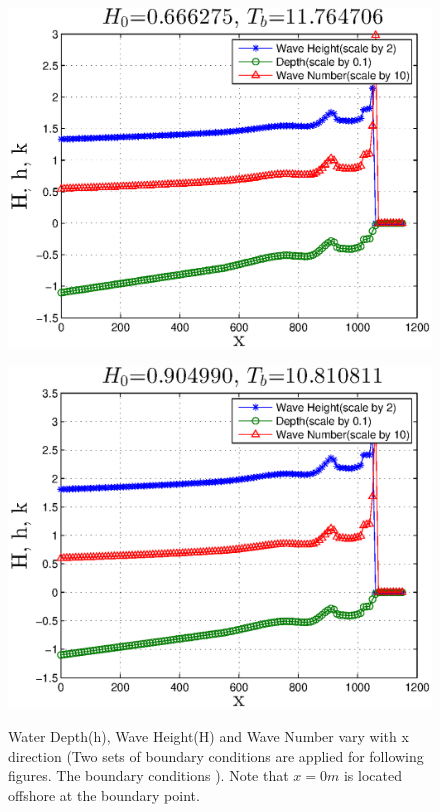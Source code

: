 \begin{figure}[h]
\begin{minipage}[b]{0.47\linewidth}
\centering
\includegraphics[width=\textwidth]{forward_plot/p1_1.eps}
\label{FigHhk_1}
\end{minipage}
\hspace{0.2cm}
\begin{minipage}[b]{0.47\linewidth}
\centering
\includegraphics[width=\textwidth]{forward_plot/p2_1.eps}
\label{FigHhk_2}
\end{minipage}
\caption{Water Depth(h), Wave Height(H) and Wave Number vary with x direction (Two sets of boundary conditions are applied for following figures. The boundary conditions ). Note that $x=0 m$ is located offshore at the boundary point.}
\end{figure}

